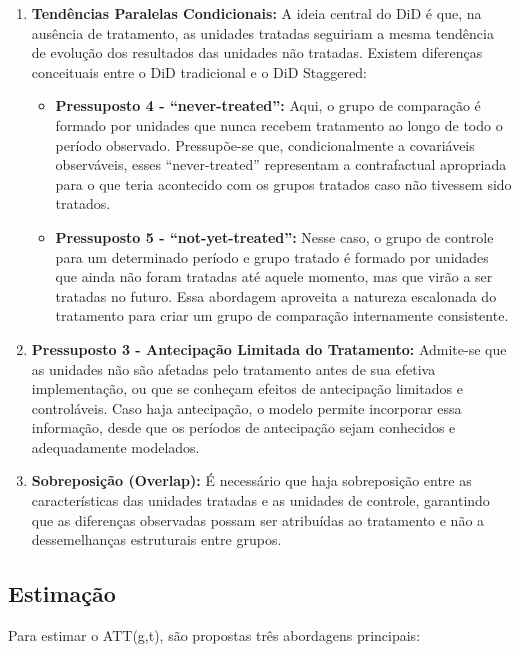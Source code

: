 \documentclass[
	12pt,				%
	openright,			%
	oneside,			%
	a4paper,			%
	english,			%
	french,				%
	spanish,			%
	brazil				%
	]{abntex2}
\begin{document}
\begin{enumerate}
\item \textbf{Tendências Paralelas Condicionais:} A ideia central do DiD é que, na ausência de tratamento, as unidades tratadas seguiriam a mesma tendência de evolução dos resultados das unidades não tratadas. Existem diferenças conceituais entre o DiD tradicional e o DiD Staggered:
   \begin{itemize}
   \item \textbf{Pressuposto 4 - ``never-treated'':} Aqui, o grupo de comparação é formado por unidades que nunca recebem tratamento ao longo de todo o período observado. Pressupõe-se que, condicionalmente a covariáveis observáveis, esses ``never-treated'' representam a contrafactual apropriada para o que teria acontecido com os grupos tratados caso não tivessem sido tratados.
   \item \textbf{Pressuposto 5 - ``not-yet-treated'':} Nesse caso, o grupo de controle para um determinado período e grupo tratado é formado por unidades que ainda não foram tratadas até aquele momento, mas que virão a ser tratadas no futuro. Essa abordagem aproveita a natureza escalonada do tratamento para criar um grupo de comparação internamente consistente.
   \end{itemize}

\item \textbf{Pressuposto 3 - Antecipação Limitada do Tratamento:} Admite-se que as unidades não são afetadas pelo tratamento antes de sua efetiva implementação, ou que se conheçam efeitos de antecipação limitados e controláveis. Caso haja antecipação, o modelo permite incorporar essa informação, desde que os períodos de antecipação sejam conhecidos e adequadamente modelados.

\item \textbf{Sobreposição (Overlap):} É necessário que haja sobreposição entre as características das unidades tratadas e as unidades de controle, garantindo que as diferenças observadas possam ser atribuídas ao tratamento e não a dessemelhanças estruturais entre grupos.
\end{enumerate}

\subsection{Estimação}

Para estimar o ATT(g,t), são propostas três abordagens principais:
\end{document}
